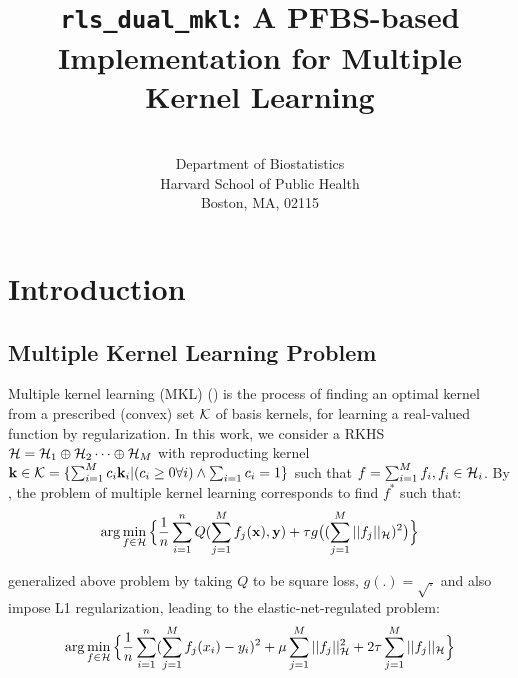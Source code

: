 \documentclass[tablecaption=bottom,wcp]{jmlr} %
\title{{\tt rls\_dual\_mkl}: A PFBS-based Implementation for Multiple Kernel Learning}
\author{\Name{(Jeremiah) Zhe Liu} \Email{zhl112@mail.harvard.edu}\\
   \addr Department of Biostatistics\\
   Harvard School of Public Health\\
   Boston, MA, 02115}
\begin{document}
\maketitle
\vspace*{-4em}
\tableofcontents



\newpage
\section{Introduction}
\subsection{Multiple Kernel Learning Problem}

Multiple kernel learning (MKL) (\citet{jordan-mkl-2004}) is the process of finding an optimal kernel
from a prescribed (convex) set ${\cal K}$ of basis kernels, for learning a real-valued function by regularization. In this work, we consider a RKHS ${\cal H} = {\cal H}_1 \oplus {\cal H}_2 \dots \oplus {\cal H}_M$ with reproducting kernel ${\bf k} \in {\cal K} = \{\sum_{i=1}^M c_i{\bf k}_i | ( c_i \geq 0 \forall i) \wedge \sum_{i=1} c_i = 1 \}$ such that $f = \sum_{i=1}^M f_i, f_i \in {\cal H}_i$. By \citet{micchelli-convex-2005}, the problem of multiple kernel learning corresponds to find $f^*$ such that:
\begin{align*}
\arg \min_{f \in {\cal H}} \Big\{
\frac{1}{n} \sum_{i=1}^n Q(\sum_{j=1}^M f_j({\bf x}), {\bf y}) + 
\tau g \big( (\sum_{j=1}^M ||f_j||_{\cal H} )^2  \big)
\Big\}
\end{align*}

\citet{rosasco-prox-2009} generalized above problem by taking $Q$ to be square loss, $g(.) = \sqrt{.}$ and also impose L1 regularization, leading to the elastic-net-regulated problem:
\begin{align}\label{eq:primal}
\arg \min_{f \in {\cal H}} \Big\{
\frac{1}{n} \sum_{i=1}^n (\sum_{j=1}^M f_j(x_i) - y_i)^2 + 
\mu \sum_{j=1}^M ||f_j||^2_{\cal H} +
2\tau \sum_{j=1}^M ||f_j||_{\cal H} \Big\}
\end{align}
\end{document}
